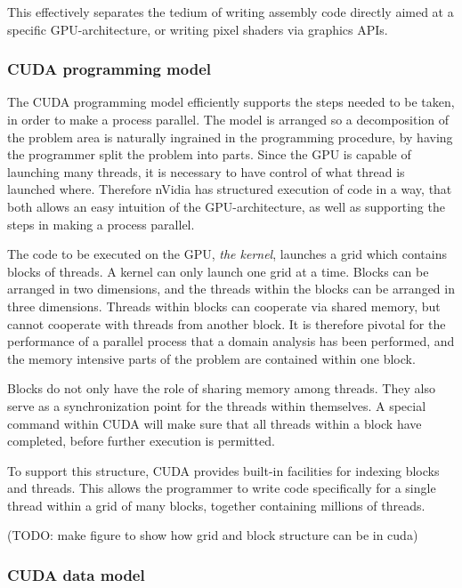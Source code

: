 This effectively separates the tedium of writing assembly code directly aimed at a specific GPU-architecture, or writing pixel shaders via graphics APIs.

\subsubsection{CUDA programming model}
The CUDA programming model efficiently supports the steps needed to be taken, in order to make a process parallel. The model is arranged so a decomposition of the problem area is naturally ingrained in the programming procedure, by having the programmer split the problem into parts. Since the GPU is capable of launching many threads, it is necessary to have control of what thread is launched where. Therefore nVidia has structured execution of code in a way, that both allows an easy intuition of the GPU-architecture, as well as supporting the steps in making a process parallel.

The code to be executed on the GPU, \emph{the kernel}, launches a grid which contains blocks of threads. A kernel can only launch one grid at a time. Blocks can be arranged in two dimensions, and the threads within the blocks can be arranged in three dimensions. Threads within blocks can cooperate via shared memory, but cannot cooperate with threads from another block. It is therefore pivotal for the performance of a parallel process that a domain analysis has been performed, and the memory intensive parts of the problem are contained within one block.

Blocks do not only have the role of sharing memory among threads. They also serve as a synchronization point for the threads within themselves. A special command within CUDA will make sure that all threads within a block have completed, before further execution is permitted.

To support this structure, CUDA provides built-in facilities for indexing blocks and threads. This allows the programmer to write code specifically for a single thread within a grid of many blocks, together containing millions of threads.

(TODO: make figure to show how grid and block structure can be in cuda)


\subsubsection{CUDA data model}

